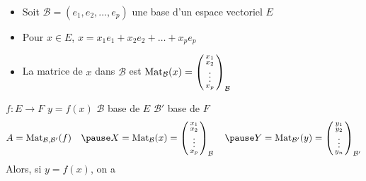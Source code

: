 \begin{frame}

\begin{itemize}
  \item Soit $\mathcal{B} = (e_1,e_2, \dots ,e_p )$ une base d'un espace vectoriel $E$
  \pause
  \item Pour  $x \in E$, $x=x_1e_1+x_2e_2+\dots +x_p e_p$
\pause
  \item La matrice de $x$ dans $\mathcal{B}$ est $\mathop{\text{Mat}}\nolimits_\mathcal{B} (x) = 
  \left(\begin{smallmatrix}x_1\cr x_2\cr \vdots \cr x_p\end{smallmatrix}\right)_\mathcal{B}$
\end{itemize}

\pause
\vspace*{-1ex}
\begin{proposition}
\label{prop:matetapplin}
$f : E \to F$ \pause\quad  $y=f (x)$ \quad \pause$\mathcal{B}$ base de $E$ \quad\pause $\mathcal{B}'$ base de $F$
\vspace*{-2ex}
\pause
$$A = \Mat_{\mathcal{B},\mathcal{B}'} (f) 
\quad 
\pause
X = \Mat_{\mathcal{B}} (x) = 
\left(\begin{smallmatrix}x_1\cr x_2\cr \vdots \cr x_p\end{smallmatrix}\right)_\mathcal{B}
\quad 
\pause
Y = \Mat_{\mathcal{B}'} (y) = 
  \left(\begin{smallmatrix}y_1\cr y_2\cr \vdots \cr y_n\end{smallmatrix}\right)_{\mathcal{B}'}
$$
\vspace*{-2ex}
\pause
Alors, si $y = f(x)$, on a 
\vspace*{-1ex}
\vspace*{-3ex}
\pause
{}
\end{proposition}
\end{frame}


